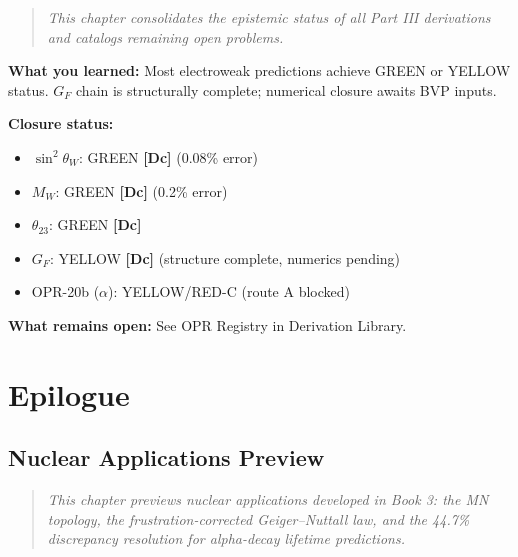 \documentclass[11pt,a4paper]{book}
\theoremstyle{definition}
\theoremstyle{remark}
\newcommand{\tagDc}{\textcolor{calibratedColor}{\textbf{[Dc]}}}
\begin{document}
\begin{quote}
\textit{This chapter consolidates the epistemic status of all Part III derivations
and catalogs remaining open problems.}
\end{quote}





\begin{chapterRecap}
\textbf{What you learned:} Most electroweak predictions achieve GREEN or YELLOW status.
$G_F$ chain is structurally complete; numerical closure awaits BVP inputs.

\textbf{Closure status:}
\begin{itemize}[nosep]
  \item $\sin^2\theta_W$: GREEN \tagDc{} (0.08\% error)
  \item $M_W$: GREEN \tagDc{} (0.2\% error)
  \item $\theta_{23}$: GREEN \tagDc{}
  \item $G_F$: YELLOW \tagDc{} (structure complete, numerics pending)
  \item OPR-20b ($\alpha$): YELLOW/RED-C (route A blocked)
\end{itemize}

\textbf{What remains open:} See OPR Registry in Derivation Library.
\end{chapterRecap}


\part*{Epilogue}

\chapter{Nuclear Applications Preview}
\label{ch:nuclear_preview}

\begin{quote}
\textit{This chapter previews nuclear applications developed in Book 3:
the MN topology, the frustration-corrected Geiger--Nuttall law, and the
44.7\% discrepancy resolution for alpha-decay lifetime predictions.}
\end{quote}
\end{document}
